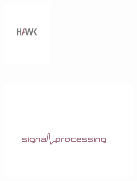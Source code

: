 \begin{titlepage}
\thispagestyle{empty}

   \begin{center}
      \vspace*{0.4cm}
      {\Huge\bfseries\sffamily \doctitle                             \\[50mm]}
      \Large
      \includegraphics[width=25mm]{format/HAWK_Magenta}              \\[3mm]
      \docinstitute                                                  \\[0mm]
      \doclongauthor                                                 \\[4mm]
      \includegraphics[width=70mm]{format/SP_Magenta}                \\[3mm]
      \href{mailto:\docmail}{\texttt{\docmail}}                      \\[30mm]
      \docdate
   \end{center}

\end{titlepage}



\newpage
\tableofcontents



